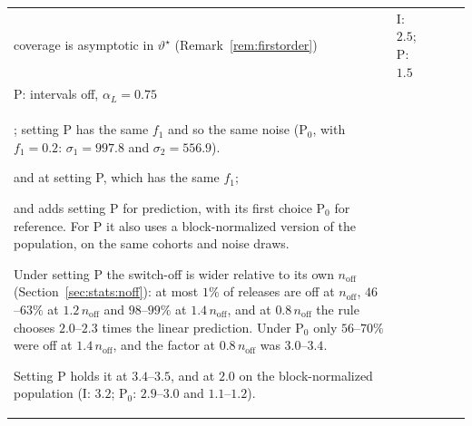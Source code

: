 \begin{tabular}{@{}lllll@{}}
coverage is asymptotic in $\vartheta^\star$ (Remark~\ref{rem:firstorder}) & I: $2.5$; P: $1.5$ \\

P: intervals off, $\alpha_L = 0.75$ \\

; setting P has the same $f_1$ and so the same noise (P$_0$, with $f_1 = 0.2$: $\sigma_1 = 997.8$ and $\sigma_2 = 556.9$).

and at setting P, which has the same $f_1$;

and adds setting P for prediction, with its first choice P$_0$ for reference. For P it also uses a block-normalized version of the population, on the same cohorts and noise draws.

  \item Under setting P the switch-off is wider relative to its own $n_{\mathrm{off}}$ (Section~\ref{sec:stats:noff}): at most $1\%$ of releases are off at $n_{\mathrm{off}}$, $46$--$63\%$ at $1.2\,n_{\mathrm{off}}$ and $98$--$99\%$ at $1.4\,n_{\mathrm{off}}$, and at $0.8\,n_{\mathrm{off}}$ the rule chooses $2.0$--$2.3$ times the linear prediction. Under P$_0$ only $56$--$70\%$ were off at $1.4\,n_{\mathrm{off}}$, and the factor at $0.8\,n_{\mathrm{off}}$ was $3.0$--$3.4$.

Setting P holds it at $3.4$--$3.5$, and at $2.0$ on the block-normalized population (I: $3.2$; P$_0$: $2.9$--$3.0$ and $1.1$--$1.2$).


\end{tabular}

